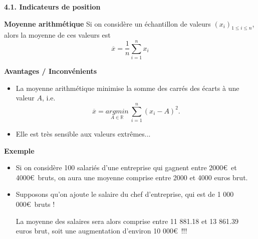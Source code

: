 \documentclass[aspectratio=169,xcolor=dvipsnames]{beamer}
\newcommand{\R}{\mathbb{R}}
\newcommand{\argmin}{argmin}
\begin{document}
\begin{frame}[plain]

\vfill

\begin{center}
{\huge \textcolor{nyubluedark}{\textbf{4.1. Indicateurs de position}}}
\end{center}

\vfill

\end{frame}

\begin{frame}
	\begin{block}{\textbf{Moyenne arithmétique}}
	Si on considère un échantillon de valeurs $(x_i)_{1\leqslant i \leqslant n}$, alors la moyenne de ces valeurs est
		\[
		\overline{x} = \dfrac{1}{n} \sum_{i=1}^n x_i
		\]
	\end{block}
	
	\begin{exampleblock}{\textbf{Avantages / Inconvénients}}
		\begin{itemize}
		\item[\faPlusCircle] La moyenne arithmétique minimise la somme des carrés des écarts à une valeur $A$, i.e.
			\[
			\overline{x} = \underset{A \in \R}{\argmin} \ \sum_{i=1}^n (x_i-A)^2.
			\]
		\item[\faMinusCircle] Elle est très sensible aux valeurs extrêmes...
		\end{itemize}
	\end{exampleblock}
	
\end{frame}

\begin{frame}
	\begin{exampleblock}{\textbf{Exemple}}
		\begin{itemize}
		\item Si on considère 100 salariés d'une entreprise qui gagnent entre 2000\euro \ et 4000\euro \ bruts, on aura une moyenne comprise entre 2000 et 4000 euros brut.
		\item Supposons qu'on ajoute le salaire du chef d'entreprise, qui est de 1 000 000\euro \ bruts !
		
		La moyenne des salaires sera alors comprise entre 11 881.18 et 13 861.39 euros brut, soit une augmentation d'environ 10 000\euro \ !!!
		\end{itemize}

	\end{exampleblock}
\end{frame}
\end{document}
